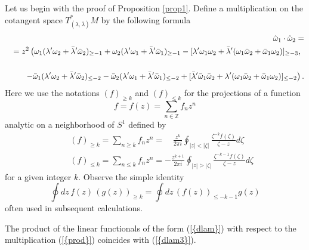 \documentclass[numbook, envcountsame, envcountreset]{svjour3}
\begin{document}
Let us begin with the proof of Proposition \ref{prop1}.
Define a multiplication on the cotangent space $T^*_{(\lambda, \bar\lambda)}M$ by the following formula
\begin{eqnarray}\label{prod}
&&
\hat\omega_1\cdot \hat\omega_2=
\\
&&
=z^2 \left( \omega_1 (\lambda' \omega_2 +\bar\lambda'\bar\omega_2)_{\geq -1} +\omega_2 (\lambda' \omega_1 +\bar\lambda'\bar\omega_1)_{\geq -1}-[\lambda'\omega_1\omega_2 +\bar\lambda'(\omega_1\bar\omega_2+\bar\omega_1\omega_2)]_{\geq -3},
\right.
{\nonumber}\\
&&
{\nonumber}\\
&&
\left.
-\bar\omega_1 (\lambda'\omega_2+\bar\lambda'\bar\omega_2)_{\leq -2} - \bar\omega_2 (\lambda'\omega_1+\bar\lambda'\bar\omega_1)_{\leq -2} +[\bar\lambda'\bar\omega_1 \bar\omega_2 +\lambda'(\omega_1\bar\omega_2 +\bar\omega_1\omega_2)]_{\leq -2}
 \right).
 {\nonumber}
\end{eqnarray}
Here we use the notations $\left( f\right)_{\geq k} $ and $\left( f\right)_{\leq k} $ for the projections of a function 
$$
f=f(z)=\sum_{n\in \mathbb Z} f_n z^n
$$ 
analytic on a neighborhood of $S^1$ defined by
\begin{eqnarray}\label{proj1}
&&
\left( f\right)_{\geq k}=\sum_{n\geq k} f_n z^n=\quad\frac{z^k}{2\pi i} \oint_{|z|<|\zeta|} \frac{\zeta^{-k} f(\zeta)}{\zeta-z} d\zeta
\\
&&
\left( f\right)_{\leq k}=\sum_{n\leq k} f_n z^n=-\frac{z^{k+1}}{2\pi i} \oint_{|z|>|\zeta|} \frac{\zeta^{-k-1} f(\zeta)}{\zeta-z} d\zeta
\label{proj2}
\end{eqnarray}
for a given integer $k$. Observe the simple identity
\begin{equation}\label{ide}
\oint dz\, f(z)\, \left(g(z)\right)_{\geq k} = \oint dz\, \left(f(z)\right)_{\leq -k-1}  g(z)
\end{equation}
often used in subsequent calculations. 

\begin{lemma}\label{lem20} The product of the linear functionals of the form {(\ref{{dlam}})} with respect to the multiplication {(\ref{{prod}})} coincides with {(\ref{{dlam3}})}.
\end{lemma}
\end{document}
